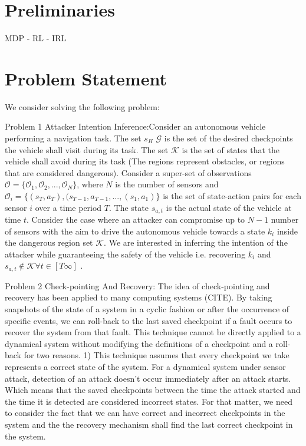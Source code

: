 \documentclass[conference]{IEEEtran}
\begin{document}
\section{Preliminaries}\label{sec:Preliminaries}
MDP - RL - IRL
\section{Problem Statement}\label{sec:problem}
We consider solving the following problem:

Problem 1 Attacker Intention Inference:Consider an autonomous vehicle performing a navigation task. The set $s_H$ $\mathcal{G}$ is the set of the desired checkpoints the vehicle shall visit during its task. The set $\mathcal{K}$ is the set of states that the vehicle shall avoid during its task (The regions represent obstacles, or regions that are considered dangerous). Consider a super-set of observations $\mathcal{O} = \{\mathcal{O}_1, \mathcal{O}_2, ..., \mathcal{O}_N\}$, where $N$ is the number of sensors and $\mathcal{O}_i = \{(s_T, a_T), (s_{T-1}, a_{T-1}, ..., (s_1, a_1)\}$ is the set of state-action pairs for each sensor $i$ over a time period $T$. The state $s_{a,t}$ is the actual state of the vehicle at time $t$. Consider the case where an attacker can compromise up to $N-1$ number of sensors with the aim to drive the autonomous vehicle towards a state $k_i$ inside the dangerous region set $\mathcal{K}$. We are interested in inferring the intention of the attacker while guaranteeing the safety of the vehicle i.e. recovering $k_i$ and $s_{a,t} \notin \mathcal{K} \forall t \in [T  \infty]$ .

Problem 2 Check-pointing And Recovery:
The idea of check-pointing and recovery has been applied to many computing systems (CITE). By taking snapshots of the state of a system in a cyclic fashion or after the occurrence of specific events, we can roll-back to the last saved checkpoint if a fault occurs to recover the system from that fault. This technique cannot be directly applied to a dynamical system without modifying the definitions of a checkpoint and a roll-back for two reasons. 
1) This technique assumes that every checkpoint we take represents a correct state of the system. For a dynamical system under sensor attack, detection of an attack doesn't occur immediately after an attack starts. Which means that the saved checkpoints between the time the attack started and the time it is detected are considered incorrect states. For that matter, we need to consider the fact that we can have correct and incorrect checkpoints in the system and the the recovery mechanism shall find the last correct checkpoint in the system.
\end{document}

